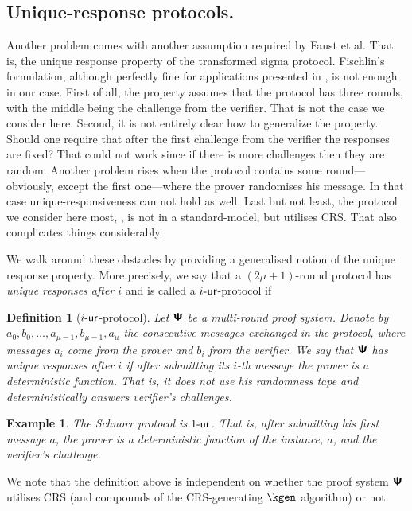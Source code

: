 \let\accentvec\vec \documentclass[runningheads,10pt]{llncs}
\newtheorem{definition}[theorem]{Definition}
\newtheorem{example}[theorem]{Example} } \usepackage{soul} \usepackage{soulutf8}
\begin{document}
\subsection{Unique-response protocols.}
Another problem comes with another assumption required by Faust et al. That is, the unique response property of the transformed sigma protocol.
Fischlin's formulation, although perfectly fine for applications presented in \cite{C:Fischlin05}, is not enough in our case.
First of all, the property assumes that the protocol has three rounds, with the middle being the challenge from the verifier. That is not the case we consider here. Second, it is not entirely clear how to generalize the property. Should one require that after the first challenge from the verifier the responses are fixed? That could not work since if there is more challenges then they are random.
Another problem rises when the protocol contains some round---obviously, except the first one---where the prover randomises his message. In that case unique-responsiveness can not hold as well.
Last but not least, the protocol we consider here most, \plonk, is not in a standard-model, but utilises CRS. That also complicates things considerably.

We walk around these obstacles by providing a generalised notion of the unique response property.
More precisely, we say that a $(2\mu + 1)$-round protocol has \emph{unique responses after $i$} and is called a ${i\text{-}\mathsf{ur}}$-protocol if
\begin{definition}[${i\text{-}\mathsf{ur}}$-protocol]
	\label{def:wiur}
	Let $\bm{\mathsf{\Psi}}$ be a multi-round proof system.
	Denote by $a_0, b_0, \ldots, a_{\mu - 1}, b_{\mu - 1}, a_{\mu}$ the consecutive messages exchanged in the protocol, where messages $a_i$ come from the prover and $b_i$ from the verifier.
	We say that $\bm{\mathsf{\Psi}}$ has \emph{unique responses after $i$}
	if after submitting its $i$-th message the prover is a deterministic function. That is, it does not use his randomness tape and deterministically answers verifier's challenges.
\end{definition}
\begin{example}
	The Schnorr protocol is ${1\text{-}\mathsf{ur}}$. That is, after submitting his first message $a$, the prover is a deterministic function of the instance, $a$, and the verifier's challenge.
\end{example}

We note that the definition above is independent on whether the proof system $\bm{\mathsf{\Psi}}$ utilises CRS (and compounds of the CRS-generating $\kgen$ algorithm) or not.
\end{document}
